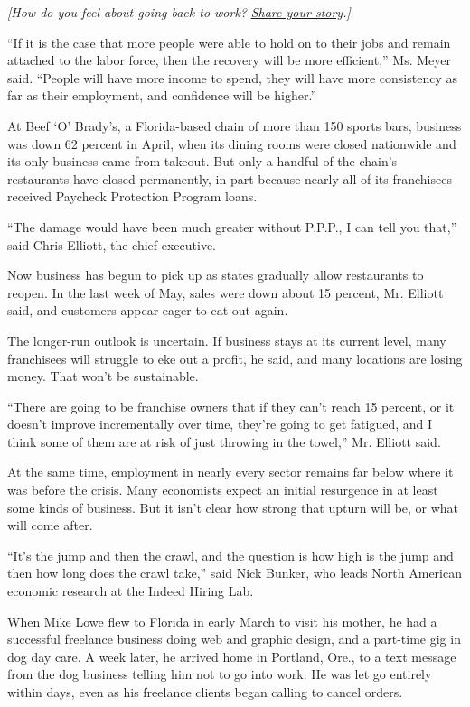 \emph{{[}How do you feel about going back to work?}
\href{https://www.nytimes3xbfgragh.onion/2020/05/15/us/as-cities-reopen-how-do-you-feel-about-going-out.html}{\emph{Share
your story}}\emph{.{]}}

``If it is the case that more people were able to hold on to their jobs
and remain attached to the labor force, then the recovery will be more
efficient,'' Ms. Meyer said. ``People will have more income to spend,
they will have more consistency as far as their employment, and
confidence will be higher.''

At Beef `O' Brady's, a Florida-based chain of more than 150 sports bars,
business was down 62 percent in April, when its dining rooms were closed
nationwide and its only business came from takeout. But only a handful
of the chain's restaurants have closed permanently, in part because
nearly all of its franchisees received Paycheck Protection Program
loans.

``The damage would have been much greater without P.P.P., I can tell you
that,'' said Chris Elliott, the chief executive.

Now business has begun to pick up as states gradually allow restaurants
to reopen. In the last week of May, sales were down about 15 percent,
Mr. Elliott said, and customers appear eager to eat out again.

The longer-run outlook is uncertain. If business stays at its current
level, many franchisees will struggle to eke out a profit, he said, and
many locations are losing money. That won't be sustainable.

``There are going to be franchise owners that if they can't reach 15
percent, or it doesn't improve incrementally over time, they're going to
get fatigued, and I think some of them are at risk of just throwing in
the towel,'' Mr. Elliott said.

At the same time, employment in nearly every sector remains far below
where it was before the crisis. Many economists expect an initial
resurgence in at least some kinds of business. But it isn't clear how
strong that upturn will be, or what will come after.

``It's the jump and then the crawl, and the question is how high is the
jump and then how long does the crawl take,'' said Nick Bunker, who
leads North American economic research at the Indeed Hiring Lab.

When Mike Lowe flew to Florida in early March to visit his mother, he
had a successful freelance business doing web and graphic design, and a
part-time gig in dog day care. A week later, he arrived home in
Portland, Ore., to a text message from the dog business telling him not
to go into work. He was let go entirely within days, even as his
freelance clients began calling to cancel orders.

